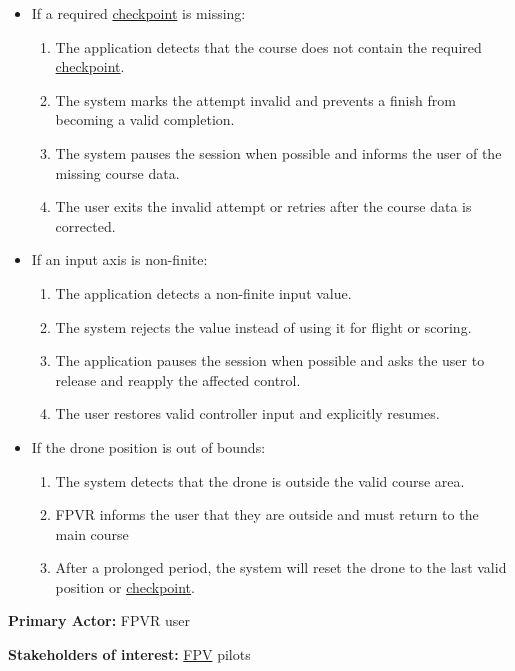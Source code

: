 \documentclass[12pt]{article}
\begin{document}
\begin{description}
\begin{itemize}
\begin{enumerate}
\item The system restores flight control from the paused state.
\end{enumerate}
\item If a required \hyperlink{glos:Checkpoint}{checkpoint} is missing:
\begin{enumerate}
\item The application detects that the course does not contain the required \hyperlink{glos:Checkpoint}{checkpoint}.
\item The system marks the attempt invalid and prevents a finish from becoming a
valid completion.
\item The system pauses the session when possible and informs the user of the
missing course data.
\item The user exits the invalid attempt or retries after the course data is
corrected.
\end{enumerate}
\item If an input axis is non-finite:
\begin{enumerate}
\item The application detects a non-finite input value.
\item The system rejects the value instead of using it for flight or scoring.
\item The application pauses the session when possible and asks the user to release and
reapply the affected control.
\item The user restores valid controller input and explicitly resumes.
\end{enumerate}
\item If the drone position is out of bounds:
\begin{enumerate}
\item The system detects that the drone is outside the valid course
area.
\item FPVR informs the user that they are outside and must return to the main course
\item After a prolonged period, the system will reset the drone to the last valid position or \hyperlink{glos:Checkpoint}{checkpoint}.
\end{enumerate}
\end{itemize}

\item[U-03: Recover from Crash during a Course.]\mbox{}

\textbf{Primary Actor:} FPVR user

\textbf{Stakeholders of interest:} \hyperlink{glos:FPV}{FPV} pilots


\end{description}
\end{document}
